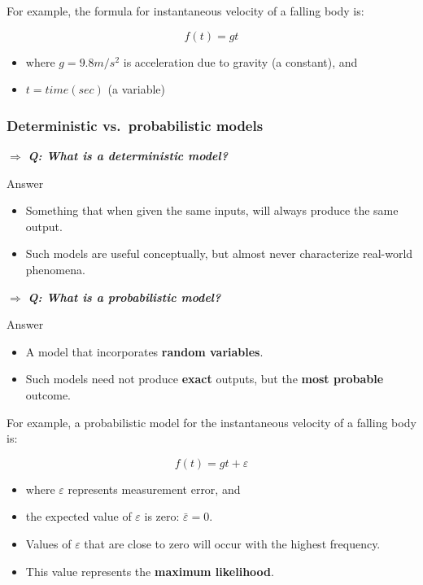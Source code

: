 \documentclass[
]{article}
\providecommand{\tightlist}{%
  \setlength{\itemsep}{0pt}\setlength{\parskip}{0pt}}
\begin{document}
For example, the formula for instantaneous velocity of a falling body
is:

\[f(t) = gt\]

\begin{itemize}
\tightlist
\item
  where \(g=9.8m/s^2\) is acceleration due to gravity (a constant), and
\item
  \(t = time (sec)\) (a variable)
\end{itemize}

\hypertarget{deterministic-vs.-probabilistic-models}{%
\subsubsection{Deterministic vs.~probabilistic
models}\label{deterministic-vs.-probabilistic-models}}

\(\Rightarrow\) \textbf{\emph{Q: What is a deterministic model?}}

Answer

\begin{itemize}
\tightlist
\item
  Something that when given the same inputs, will always produce the
  same output.
\item
  Such models are useful conceptually, but almost never characterize
  real-world phenomena.
\end{itemize}

\(\Rightarrow\) \textbf{\emph{Q: What is a probabilistic model?}}

Answer

\begin{itemize}
\tightlist
\item
  A model that incorporates \textbf{random variables}.
\item
  Such models need not produce \textbf{exact} outputs, but the
  \textbf{most probable} outcome.
\end{itemize}

For example, a probabilistic model for the instantaneous velocity of a
falling body is:

\[f(t) = gt + \varepsilon\]

\begin{itemize}
\tightlist
\item
  where \(\varepsilon\) represents measurement error, and
\item
  the expected value of \(\varepsilon\) is zero:
  \(\bar{\varepsilon} = 0\).
\item
  Values of \(\varepsilon\) that are close to zero will occur with the
  highest frequency.
\item
  This value represents the \textbf{maximum likelihood}.
\end{itemize}
\end{document}

